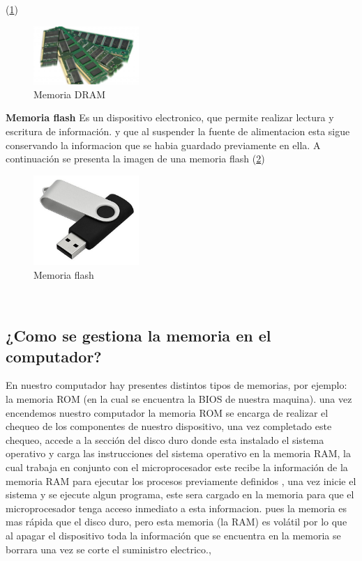\documentclass{article}
\begin{document}
(\ref{fig:memoria-DRAM})
\begin{figure}[h]
\includegraphics[width=4cm]{dram.jpg}\centering
\caption{Memoria DRAM}
\label{fig:memoria-DRAM}
\end{figure}
\newline
\newline
\textbf{Memoria flash}
Es un dispositivo electronico, que permite realizar lectura y escritura de información. y que al suspender la fuente de alimentacion esta sigue conservando la informacion que se habia guardado previamente en ella.
\newline
\newline
A continuación se presenta la imagen de una memoria flash
(\ref{fig:memoria-flash})
\begin{figure}[h]
\includegraphics[width=4cm]{memoria-flash.jpg}\centering
\caption{Memoria flash}
\label{fig:memoria-flash}
\end{figure}
\newline
\newline
\

\subsection{¿Como se gestiona la memoria en el computador?}
\newline
En nuestro computador hay presentes distintos tipos de memorias, por ejemplo: la memoria ROM (en la cual se encuentra la BIOS de nuestra maquina). una vez encendemos nuestro computador la memoria ROM se encarga de realizar el chequeo de los componentes de nuestro dispositivo, una vez completado este chequeo, accede a la sección del disco duro donde esta instalado el sistema operativo y carga las instrucciones del sistema operativo en la memoria RAM, la cual  trabaja en conjunto con el microprocesador este recibe la información de la memoria RAM para ejecutar los procesos previamente definidos , una vez inicie el sistema y se ejecute algun programa, este sera cargado en la memoria para que el microprocesador tenga acceso inmediato a esta informacion. pues la memoria es mas rápida que el disco duro, pero esta memoria (la RAM) es volátil por lo que al apagar el dispositivo toda la información que se encuentra en la memoria se borrara una vez se corte el suministro electrico.\cite{Gestion},\cite{Guia}
\newline
\end{document}
